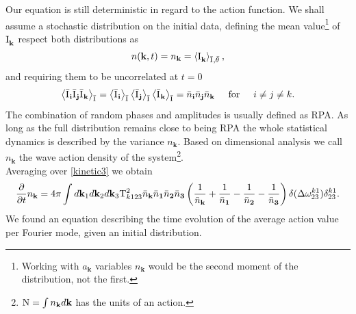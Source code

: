 Our equation is still deterministic in regard to the action function. We shall assume a stochastic distribution on the initial data, defining 
the mean value\footnote{Working with $a_\mathbf{k}$ variables $n_\mathbf{k}$ would be the second moment of the distribution, not the first.}
of $\mathrm{I}^{}_\mathbf{k}$ respect both distributions as 
\begin{equation}
    n(\mathbf{k},t) = n_\mathbf{k} = \left\langle \mathrm{I}^{}_\mathbf{k} \right\rangle_{\bar{\mathrm{I}^{}}, \bar{\theta}^{}},
    \label{wavdef}
\end{equation}     
and requiring them to be uncorrelated at $t=0$ \\
\begin{equation}
    \left\langle \bar{\mathrm{I}^{}}_\mathbf{i} \bar{\mathrm{I}^{}}_\mathbf{j} \bar{\mathrm{I}^{}}_\mathbf{k}\right\rangle_{\bar{\mathrm{I}^{}}} = 
    \left\langle\bar{\mathrm{I}^{}}_\mathbf{i} \right\rangle_{\bar{\mathrm{I}^{}}} \left\langle \bar{\mathrm{I}^{}}_\mathbf{j} \right\rangle_{\bar{\mathrm{I}^{}}} \left\langle \bar{\mathrm{I}^{}}_\mathbf{k} \right\rangle_{\bar{\mathrm{I}^{}}}
    = \bar{n}_\mathbf{i} \bar{n}_\mathbf{j} \bar{n}_\mathbf{k} \hspace{5mm} \text{for} \hspace{5mm} i\neq j\neq k.
\end{equation}
The combination of random phases and amplitudes is usually defined as RPA. As long as the full distribution remains close to being RPA the whole statistical dynamics
is described by the variance $n_\mathbf{k}$. Based on dimensional analysis we call 
$n_\mathbf{k}$ the wave action density of the system\footnote{$\mathrm{N} = \int n_\mathbf{k} d\mathbf{k}$ has the units of an action.}.\\
Averaging over \eqref{kinetic3} we obtain
\begin{equation}
    \frac{\partial}{\partial t} n_\mathbf{k} = 4 \pi\int d\mathbf{k}_1 d\mathbf{k}_2 d\mathbf{k}_3 \\
    \mathrm{T}^2_{k123}\bar{n}_\mathbf{k}\bar{n}_\mathbf{1}\bar{n}_\mathbf{2}\bar{n}_\mathbf{3}
    \left(\frac{1}{\bar{n}_\mathbf{k}} + \frac{1}{\bar{n}_\mathbf{1}} - \frac{1}{\bar{n}_\mathbf{2}}- \frac{1}{\bar{n}_\mathbf{3}}  \right)
    \delta(\Delta{\omega}^{k1}_{23})\delta^{k1}_{23}.
    \label{kinetic4}
\end{equation}
We found an equation describing the time evolution of the average action value per Fourier mode, given an initial distribution.\\

